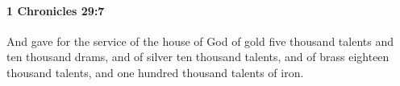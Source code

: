 
		\paragraph{1 Chronicles 29:7} %
			\label{1CHRONICLES-29-7}

			And gave for the service of the house of God of gold five thousand talents and ten thousand drams, and of silver ten thousand talents, and of brass eighteen thousand talents, and one hundred thousand talents of iron.


